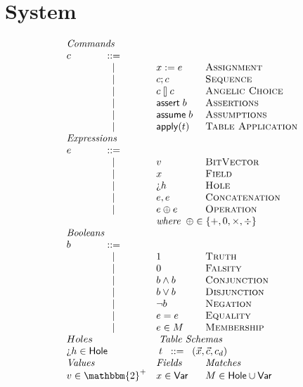 \section{System}


\begin{figure}[ht]
  \[\begin{array}{l c l l}
      \multicolumn{4}{l}{\textit{Commands}}\\
      c & ::=& \\
        & \mid & x := e & \textsc{Assignment}\\
        & \mid & c;c & \textsc{Sequence} \\
        & \mid & c \angel c & \textsc{Angelic Choice}\\
        & \mid & \assert b & \textsc{Assertions} \\
        & \mid & \assume b & \textsc{Assumptions} \\
        & \mid & \apply t & \textsc{Table Application}\\
      \multicolumn{4}{l}{\textit{Expressions}} \\
      e & ::= & \\
        & \mid & v            & \textsc{BitVector} \\
        & \mid & x            & \textsc{Field} \\
        & \mid & \hole h       & \textsc{Hole} \\
        & \mid & e,e          & \textsc{Concatenation} \\
        & \mid & e \oplus e   & \textsc{Operation} \\
        & &  \multicolumn{2}{l}{\textit{where}\;\; \oplus \in \{+,0,\times, \div\}} \\
      \multicolumn{4}{l}{\textit{Booleans}}\\
      b & ::= & \\
        & \mid & \TRUE & \textsc{Truth} \\
        & \mid & \FALSE & \textsc{Falsity} \\
        & \mid & b \wedge b & \textsc{Conjunction} \\
        & \mid & b \vee b & \textsc{Disjunction} \\
        & \mid & \neg b & \textsc{Negation} \\
        & \mid & e = e & \textsc{Equality} \\
        & \mid & e \in M & \textsc{Membership} \\
      \multicolumn{2}{l}{Holes} & \multicolumn{2}{l}{\;\textit{Table Schemas}}  \\
      \multicolumn{2}{l}{\hole h \in \mathsf{Hole}} & \multicolumn{2}{l}{\;t \;\; ::= \;\;(\vec x, \vec c, c_d)} \\
      \multicolumn{2}{l}{\textit{Values}} & \multicolumn{1}{l}{\textit{Fields}} & \multicolumn{1}{l}{\textit{Matches}}\\
      \multicolumn{2}{l}{v \in \mathbbm{2}^+} & \multicolumn{1}{l}{x \in \mathsf{Var}} & \multicolumn{1}{l}{M \in \mathsf{Hole} \cup \mathsf{Var}}
    \end{array}\]


\end{figure}
